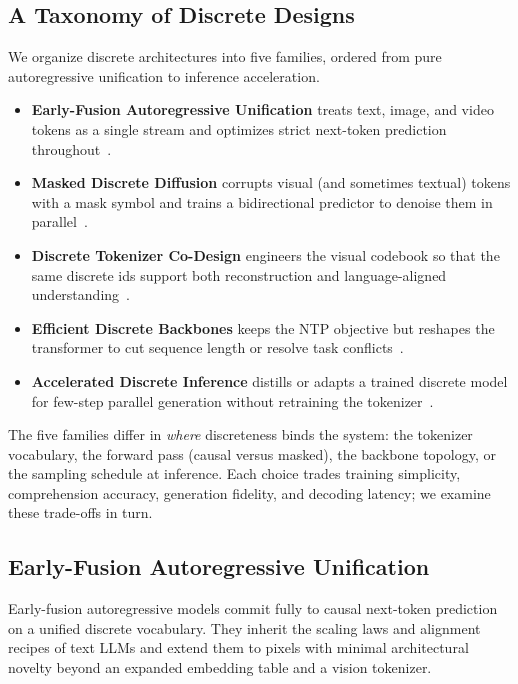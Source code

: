 \subsection{A Taxonomy of Discrete Designs}
\label{subsec:discrete-taxonomy}

We organize discrete architectures into five families, ordered from pure autoregressive unification to inference acceleration.

\begin{itemize}
    \item \textbf{Early-Fusion Autoregressive Unification} treats text, image, and video tokens as a single stream and optimizes strict next-token prediction throughout~\cite{team2024chameleon,chern2024anole,liu2024lumina,wang2024emu3,cui2025emu3,wu2025vila,han2026vision}.
    \item \textbf{Masked Discrete Diffusion} corrupts visual (and sometimes textual) tokens with a mask symbol and trains a bidirectional predictor to denoise them in parallel~\cite{xie2025show,yang2026mmada,shi2025muddit,xin2025lumina}.
    \item \textbf{Discrete Tokenizer Co-Design} engineers the visual codebook so that the same discrete ids support both reconstruction and language-aligned understanding~\cite{wu2025vila,ma2026unitok,han2026vision}.
    \item \textbf{Efficient Discrete Backbones} keeps the NTP objective but reshapes the transformer to cut sequence length or resolve task conflicts~\cite{li2025synergen,li2025unifork}.
    \item \textbf{Accelerated Discrete Inference} distills or adapts a trained discrete model for few-step parallel generation without retraining the tokenizer~\cite{xu2025unicms,cui2025emu3,xin2025lumina}.
\end{itemize}

The five families differ in \emph{where} discreteness binds the system: the tokenizer vocabulary, the forward pass (causal versus masked), the backbone topology, or the sampling schedule at inference. Each choice trades training simplicity, comprehension accuracy, generation fidelity, and decoding latency; we examine these trade-offs in turn.

\subsection{Early-Fusion Autoregressive Unification}
\label{subsec:early-fusion}

Early-fusion autoregressive models commit fully to causal next-token prediction on a unified discrete vocabulary. They inherit the scaling laws and alignment recipes of text LLMs and extend them to pixels with minimal architectural novelty beyond an expanded embedding table and a vision tokenizer.

